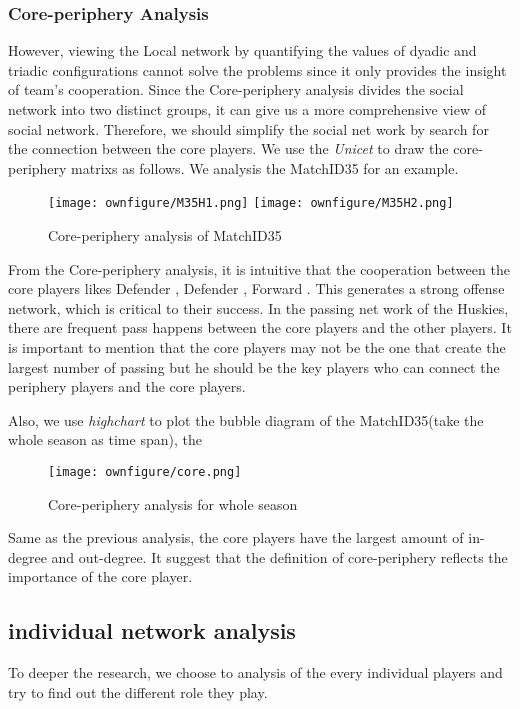 \documentclass{mcmthesis}
\begin{document}
\subsubsection{Core-periphery Analysis}
However, viewing the Local network by quantifying the values of dyadic and triadic configurations
cannot solve the problems since it only provides the insight of team's cooperation. Since the 
Core-periphery analysis divides the social network into two distinct groups, it can give us 
a more comprehensive view of social network. Therefore, we should simplify the social net work
by search for the connection between the core players.
We use the \textit{Unicet} to draw the core-periphery matrixs as follows. We analysis the MatchID35 
for an example.

\begin{figure}
  \center
  \small
  \texttt{[image: ownfigure/M35H1.png]}  
  \texttt{[image: ownfigure/M35H2.png]}
  \caption{Core-periphery analysis of MatchID35}
\end{figure}

From the Core-periphery analysis, it is intuitive that the cooperation between the core 
players likes Defender , Defender , Forward . This generates a strong offense network,
which is critical to their success. 
In the passing net work of the Huskies, there are frequent pass happens between the core players and 
the other players. 
It is important to mention that the core players may not be the one that create the largest number
of passing but he should be the key players who can connect the periphery players and the core players.

Also, we use \textit{highchart} to plot the bubble diagram of the MatchID35(take the whole season as time span), the 

\begin{figure}
  \center
  \small
  \texttt{[image: ownfigure/core.png]}
  \caption{Core-periphery analysis for whole season}
\end{figure}
Same as the previous analysis, the core players have the largest amount of in-degree and out-degree.
It suggest that the definition of core-periphery reflects the importance of the core player.


\subsection{individual network analysis}
To deeper the research, we choose to analysis of the every individual players and try to find out the
different role they play.
\end{document}
